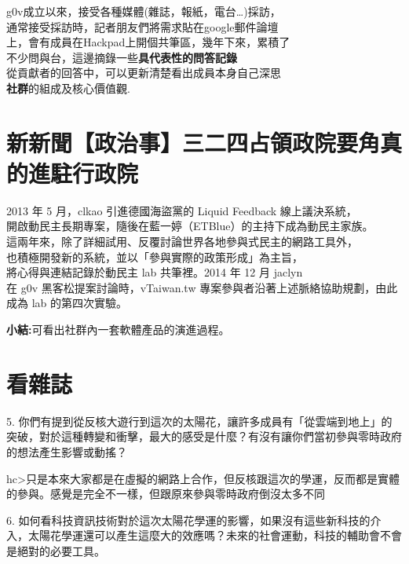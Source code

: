 
g0v成立以來，接受各種媒體(雜誌，報紙，電台…)採訪，\\
 通常接受採訪時，記者朋友們將需求貼在google郵件論壇\\
 上，會有成員在Hackpad上開個共筆區，幾年下來，累積了\\
 不少問與台，這邊摘錄一些\textbf{具代表性的問答記錄}\\
 從貢獻者的回答中，可以更新清楚看出成員本身自己深思\\
 \textbf{社群}的組成及核心價值觀. \\
\section{新新聞【政治事】三二四占領政院要角真的進駐行政院}

  2013 年 5 月，clkao 引進德國海盜黨的 Liquid Feedback 線上議決系統，\\
 開啟動民主長期專案，隨後在藍一婷（ETBlue）的主持下成為動民主家族。\\
 這兩年來，除了詳細試用、反覆討論世界各地參與式民主的網路工具外，\\
 也積極開發新的系統，並以「參與實際的政策形成」為主旨，\\
 將心得與連結記錄於動民主 lab 共筆裡。2014 年 12 月 jaclyn \\
 在 g0v 黑客松提案討論時，vTaiwan.tw 專案參與者沿著上述脈絡協助規劃，由此成為 lab 的第四次實驗。
 
 \textbf{小結:}可看出社群內一套軟體產品的演進過程。


\clearpage

\section{看雜誌}

5.  你們有提到從反核大遊行到這次的太陽花，讓許多成員有「從雲端到地上」的突破，對於這種轉變和衝擊，最大的感受是什麼？有沒有讓你們當初參與零時政府的想法產生影響或動搖？

hc\textgreater 只是本來大家都是在虛擬的網路上合作，但反核跟這次的學運，反而都是實體的參與。感覺是完全不一樣，但跟原來參與零時政府倒沒太多不同

6.  如何看科技資訊技術對於這次太陽花學運的影響，如果沒有這些新科技的介入，太陽花學運還可以產生這麼大的效應嗎？未來的社會運動，科技的輔助會不會是絕對的必要工具。

